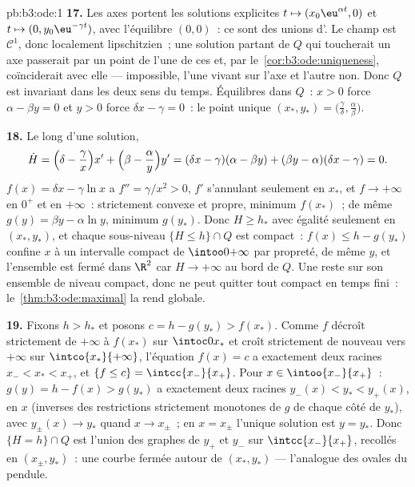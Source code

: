 \begin{solution}{pb:b3:ode:1}
\textbf{17.} Les axes portent les solutions explicites $t
\mapsto (x_0\eu^{\alpha t}, 0)$ et $t \mapsto (0,
y_0\eu^{-\gamma t})$, avec l'équilibre $(0, 0)$~: ce sont
des unions d'. Le champ est $\mathcal C^1$, donc
localement lipschitzien~; une solution partant de $Q$ qui
toucherait un axe passerait par un point de l'une de ces
 et, par le~\cref{cor:b3:ode:uniqueness}, coïnciderait
avec elle --- impossible, l'une vivant sur l'axe et l'autre
non. Donc $Q$ est invariant dans les deux sens du temps.
Équilibres dans $Q$~: $x > 0$ force $\alpha - \beta y = 0$ et
$y > 0$ force $\delta x - \gamma = 0$~: le point unique
$(x_*, y_*) = \bigl(\frac\gamma\delta,
\frac\alpha\beta\bigr)$.

\textbf{18.} Le long d'une solution,
\[
\dot H = \Bigl(\delta - \frac\gamma x\Bigr)x' +
\Bigl(\beta - \frac\alpha y\Bigr)y'
= (\delta x - \gamma)(\alpha - \beta y) +
(\beta y - \alpha)(\delta x - \gamma) = 0 .
\]
$f(x) = \delta x - \gamma\ln x$ a $f'' = \gamma/x^2 > 0$,
$f'$ s'annulant seulement en $x_*$, et $f \to +\infty$ en
$0^+$ et en $+\infty$~: strictement convexe et propre,
minimum $f(x_*)$~; de même $g(y) = \beta y - \alpha\ln y$,
minimum $g(y_*)$. Donc $H \geq h_*$ avec égalité seulement en
$(x_*, y_*)$, et chaque sous-niveau $\{H \leq h\}\cap Q$ est
compact~: $f(x) \leq h - g(y_*)$ confine $x$ à un intervalle
compact de $\intoo0{+\infty}$ par propreté, de même $y$, et
l'ensemble est fermé dans $\R^2$ car $H \to +\infty$ au bord
de $Q$. Une  reste sur son ensemble de
niveau compact, donc ne peut quitter tout compact en temps
fini~: le~\cref{thm:b3:ode:maximal} la rend globale.

\textbf{19.} Fixons $h > h_*$ et posons $c = h - g(y_*) >
f(x_*)$. Comme $f$ décroît strictement de $+\infty$ à
$f(x_*)$ sur $\intoc0{x_*}$ et croît strictement de nouveau
vers $+\infty$ sur $\intco{x_*}{+\infty}$, l'équation $f(x)
= c$ a exactement deux racines $x_- < x_* < x_+$, et $\{f
\leq c\} = \intcc{x_-}{x_+}$. Pour $x \in \intoo{x_-}{x_+}$~:
$g(y) = h - f(x) > g(y_*)$ a exactement deux racines $y_-(x)
< y_* < y_+(x)$,  en $x$ (inverses des restrictions
 strictement monotones de $g$ de chaque côté de
$y_*$), avec $y_\pm(x) \to y_*$ quand $x \to x_\pm$~; en $x
= x_\pm$ l'unique solution est $y = y_*$. Donc $\{H =
h\}\cap Q$ est l'union des graphes de $y_+$ et $y_-$ sur
$\intcc{x_-}{x_+}$, recollés en $(x_\pm, y_*)$~: une courbe
fermée autour de $(x_*, y_*)$ --- l'analogue des ovales du
pendule.


\end{solution}
